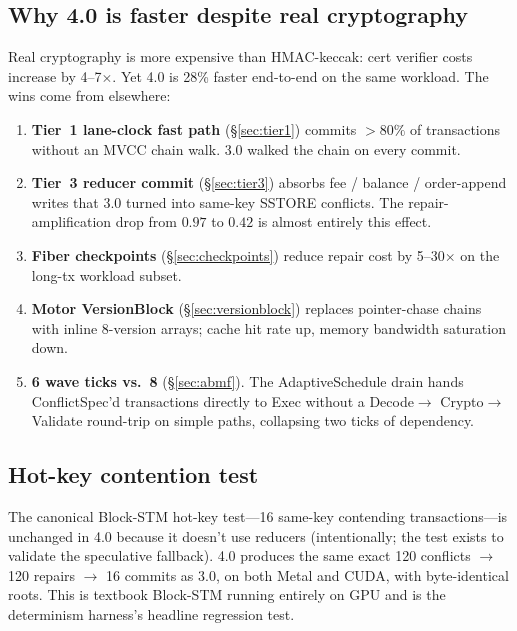 \subsection{Why 4.0 is faster despite real cryptography}

Real cryptography is more expensive than HMAC-keccak: cert verifier
costs increase by 4--7$\times$. Yet 4.0 is 28\% faster end-to-end on
the same workload. The wins come from elsewhere:

\begin{enumerate}[leftmargin=2em]
\item \textbf{Tier~1 lane-clock fast path} (\S\ref{sec:tier1}) commits
      $> 80\%$ of transactions without an MVCC chain walk. 3.0 walked
      the chain on every commit.
\item \textbf{Tier~3 reducer commit} (\S\ref{sec:tier3}) absorbs fee /
      balance / order-append writes that 3.0 turned into same-key
      SSTORE conflicts. The repair-amplification drop from $0.97$ to
      $0.42$ is almost entirely this effect.
\item \textbf{Fiber checkpoints} (\S\ref{sec:checkpoints}) reduce repair
      cost by 5--30$\times$ on the long-tx workload subset.
\item \textbf{Motor VersionBlock} (\S\ref{sec:versionblock}) replaces
      pointer-chase chains with inline 8-version arrays; cache hit
      rate up, memory bandwidth saturation down.
\item \textbf{6 wave ticks vs.\ 8} (\S\ref{sec:abmf}). The
      AdaptiveSchedule drain hands ConflictSpec'd transactions
      directly to Exec without a Decode$\rightarrow$ Crypto$\rightarrow$
      Validate round-trip on simple paths, collapsing two ticks of
      dependency.
\end{enumerate}

\subsection{Hot-key contention test}

The canonical Block-STM hot-key test---16 same-key contending
transactions---is unchanged in 4.0 because it doesn't use reducers
(intentionally; the test exists to validate the speculative
fallback). 4.0 produces the same exact 120 conflicts $\rightarrow$
120 repairs $\rightarrow$ 16 commits as 3.0, on both Metal and CUDA,
with byte-identical roots. This is textbook Block-STM running entirely
on GPU and is the determinism harness's headline regression test.

